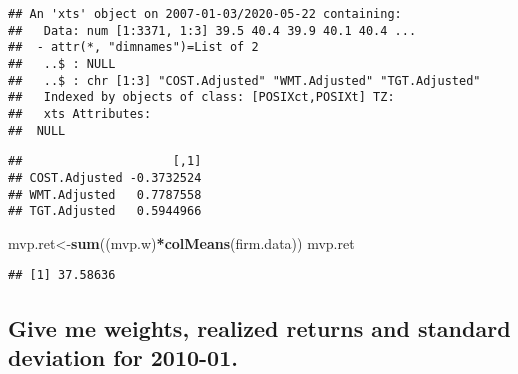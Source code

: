\documentclass[]{article}
\newenvironment{Shaded}{\begin{snugshade}}{\end{snugshade}}
\newcommand{\DataTypeTok}[1]{\textcolor[rgb]{0.13,0.29,0.53}{#1}}
\newcommand{\DecValTok}[1]{\textcolor[rgb]{0.00,0.00,0.81}{#1}}
\newcommand{\KeywordTok}[1]{\textcolor[rgb]{0.13,0.29,0.53}{\textbf{#1}}}
\newcommand{\NormalTok}[1]{#1}
\newcommand{\OperatorTok}[1]{\textcolor[rgb]{0.81,0.36,0.00}{\textbf{#1}}}
\newcommand{\StringTok}[1]{\textcolor[rgb]{0.31,0.60,0.02}{#1}}
\begin{document}
\begin{verbatim}
## An 'xts' object on 2007-01-03/2020-05-22 containing:
##   Data: num [1:3371, 1:3] 39.5 40.4 39.9 40.1 40.4 ...
##  - attr(*, "dimnames")=List of 2
##   ..$ : NULL
##   ..$ : chr [1:3] "COST.Adjusted" "WMT.Adjusted" "TGT.Adjusted"
##   Indexed by objects of class: [POSIXct,POSIXt] TZ: 
##   xts Attributes:  
##  NULL
\end{verbatim}

\begin{Shaded}
\end{Shaded}

\begin{verbatim}
##                     [,1]
## COST.Adjusted -0.3732524
## WMT.Adjusted   0.7787558
## TGT.Adjusted   0.5944966
\end{verbatim}

\begin{Shaded}
\begin{Highlighting}[]
\NormalTok{mvp.ret<-}\KeywordTok{sum}\NormalTok{((mvp.w)}\OperatorTok{*}\KeywordTok{colMeans}\NormalTok{(firm.data))}
\NormalTok{mvp.ret}
\end{Highlighting}
\end{Shaded}

\begin{verbatim}
## [1] 37.58636
\end{verbatim}

\hypertarget{give-me-weights-realized-returns-and-standard-deviation-for-2010-01.}{%
\subsection{Give me weights, realized returns and standard deviation for
2010-01.}\label{give-me-weights-realized-returns-and-standard-deviation-for-2010-01.}}
\end{document}
